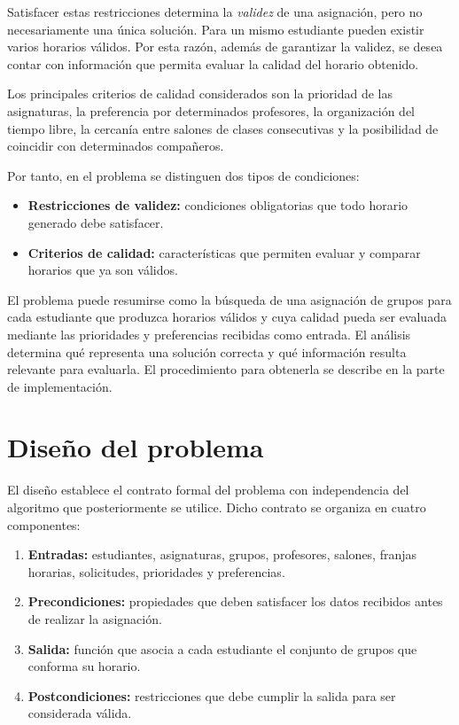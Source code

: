 \documentclass[11pt]{article}
\numberwithin{equation}{section}
\numberwithin{figure}{section}
\numberwithin{table}{section}
\theoremstyle{definition}
\begin{document}
Satisfacer estas restricciones determina la \emph{validez} de una asignación,
pero no necesariamente una única solución. Para un mismo estudiante pueden
existir varios horarios válidos. Por esta razón, además de garantizar la
validez, se desea contar con información que permita evaluar la calidad del
horario obtenido.

Los principales criterios de calidad considerados son la prioridad de las
asignaturas, la preferencia por determinados profesores, la organización del
tiempo libre, la cercanía entre salones de clases consecutivas y la posibilidad
de coincidir con determinados compañeros.

Por tanto, en el problema se distinguen dos tipos de condiciones:

\begin{itemize}
  \item \textbf{Restricciones de validez:} condiciones obligatorias que todo
        horario generado debe satisfacer.
  \item \textbf{Criterios de calidad:} características que permiten evaluar y
        comparar horarios que ya son válidos.
\end{itemize}

El problema puede resumirse como la búsqueda de una asignación de grupos para
cada estudiante que produzca horarios válidos y cuya calidad pueda ser
evaluada mediante las prioridades y preferencias recibidas como entrada.
El análisis determina qué representa una solución correcta y qué información
resulta relevante para evaluarla. El procedimiento para obtenerla se describe
en la parte de implementación.

\section{Diseño del problema}

El diseño establece el contrato formal del problema con independencia del
algoritmo que posteriormente se utilice. Dicho contrato se organiza en cuatro
componentes:

\begin{enumerate}
  \item \textbf{Entradas:} estudiantes, asignaturas, grupos, profesores,
        salones, franjas horarias, solicitudes, prioridades y preferencias.
  \item \textbf{Precondiciones:} propiedades que deben satisfacer los datos
        recibidos antes de realizar la asignación.
  \item \textbf{Salida:} función que asocia a cada estudiante el conjunto de
        grupos que conforma su horario.
  \item \textbf{Postcondiciones:} restricciones que debe cumplir la salida
        para ser considerada válida.
\end{enumerate}
\end{document}
